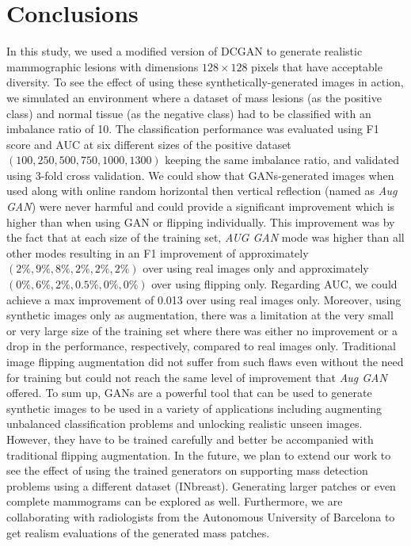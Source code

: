 \documentclass[final,3p,twocolumn,authoryear,sort&compress,times]{maia}
\begin{document}
\section{Conclusions}
\label{sec:conclusions}
In this study, we used a modified version of DCGAN to generate realistic mammographic lesions with dimensions $128 \times 128$ pixels that have acceptable diversity. To see the effect of using these synthetically-generated images in action, we simulated an environment where a dataset of mass lesions (as the positive class) and normal tissue (as the negative class) had to be classified with an imbalance ratio of 10. The classification performance was evaluated using F1 score and AUC at six different sizes of the positive dataset $(100, 250, 500, 750, 1000, 1300)$ keeping the same imbalance ratio, and validated using 3-fold cross validation. We could show that GANs-generated images when used along with online random horizontal then vertical reflection (named as \textit{Aug GAN}) were never harmful and could provide a significant improvement which is higher than when using GAN or flipping individually. This improvement was by the fact that at each size of the training set, \textit{AUG GAN} mode was higher than all other modes resulting in an F1 improvement of approximately $(2\%, 9\%, 8\%, 2\%, 2\%, 2\%)$ over using real images only and approximately $(0\%, 6\%, 2\%, 0.5\%, 0\%, 0\%)$ over using flipping only. Regarding AUC, we could achieve a max improvement of 0.013 over using real images only. Moreover, using synthetic images only as augmentation, there was a limitation at the very small or very large size of the training set where there was either no improvement or a drop in the performance, respectively, compared to real images only. Traditional image flipping augmentation did not suffer from such flaws even without the need for training but could not reach the same level of improvement that \textit{Aug GAN} offered. To sum up, GANs are a powerful tool that can be used to generate synthetic images to be used in a variety of applications including augmenting unbalanced classification problems and unlocking realistic unseen images. However, they have to be trained carefully and better be accompanied with traditional flipping augmentation. In the future, we plan to extend our work to see the effect of using the trained generators on supporting mass detection problems using a different dataset (INbreast). Generating larger patches or even complete mammograms can be explored as well. Furthermore, we are collaborating with radiologists from the Autonomous University of Barcelona to get realism evaluations of the generated mass patches.
\end{document}
